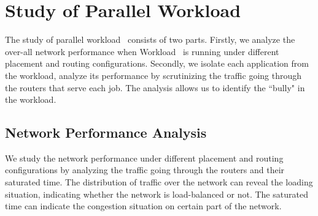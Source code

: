 
\section{Study of Parallel Workload~}
\label{sec:workload-1}

The study of parallel workload~ consists of two parts. Firstly, we analyze the over-all network performance when Workload~ is running under different placement and routing configurations. Secondly, we isolate each application from the workload, analyze its performance by scrutinizing the traffic going through the routers that serve each job. The analysis allows us to identify the ``bully" in the workload. 



\subsection{Network Performance Analysis}
\label{sec: workload-1 network analysis}

We study the network performance under different placement and routing configurations by analyzing the traffic going through the routers and their saturated time. 
The distribution of traffic over the network can reveal the loading situation, 
indicating whether the network is load-balanced or not. 
The saturated time can indicate the congestion situation on certain part of the network. 


